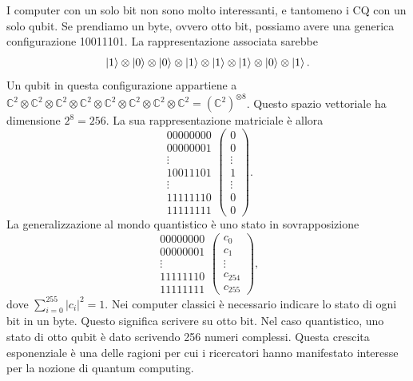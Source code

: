 I computer con un solo bit non sono molto interessanti, e tantomeno i \ac{CQ} con 
un solo qubit. Se prendiamo un byte, ovvero otto bit, possiamo avere una generica 
configurazione 10011101. La rappresentazione associata sarebbe 
\begin{equation}
    \ket{1}\otimes\ket{0}\otimes\ket{0}\otimes\ket{1}\otimes\ket{1}\otimes\ket{1}\otimes\ket{0}\otimes\ket{1}.
\end{equation}
Un qubit in questa configurazione appartiene a $\mathbb{C}^2\otimes\mathbb{C}^2\otimes\mathbb{C}^2\otimes\mathbb{C}^2\otimes\mathbb{C}^2\otimes\mathbb{C}^2\otimes\mathbb{C}^2\otimes\mathbb{C}^2 = (\mathbb{C}^2)^{\otimes 8}$. 
Questo spazio vettoriale ha dimensione $2^8=256$. La sua rappresentazione matriciale è allora
\begin{equation}
    \begin{matrix}
        00000000 \\ 
        00000001 \\ 
        \vdots \\ 
        10011101 \\
        \vdots \\
        11111110 \\ 
        11111111
    \end{matrix}
    \begin{pmatrix}
        0 \\ 0 \\ \vdots \\ 1 \\ \vdots \\ 0 \\ 0
    \end{pmatrix}
    .
\end{equation}
La generalizzazione al mondo quantistico è uno stato in sovrapposizione 
\begin{equation}
    \begin{matrix}
        00000000 \\ 
        00000001 \\ 
        \vdots \\
        11111110 \\ 
        11111111
    \end{matrix}
    \begin{pmatrix}
        c_0 \\ c_1 \\ \vdots \\ c_{254} \\ c_{255}
    \end{pmatrix},
\end{equation}
dove $\sum_{i=0}^{255}|c_i|^2=1$. 
Nei computer classici è necessario indicare lo stato di ogni bit in un byte. 
Questo significa scrivere su otto bit. Nel caso quantistico, uno stato di otto 
qubit è dato scrivendo 256 numeri complessi. Questa crescita esponenziale è 
una delle ragioni per cui i ricercatori hanno manifestato interesse per la 
nozione di quantum computing. 

